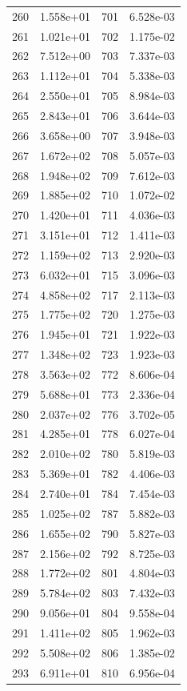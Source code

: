 \documentclass[12pt]{article}
\begin{document}
\begin{longtable}{@{}cccc@{}}
260 & 1.558e+01 & 701 & 6.528e-03 \\
261 & 1.021e+01 & 702 & 1.175e-02 \\
262 & 7.512e+00 & 703 & 7.337e-03 \\
263 & 1.112e+01 & 704 & 5.338e-03 \\
264 & 2.550e+01 & 705 & 8.984e-03 \\
265 & 2.843e+01 & 706 & 3.644e-03 \\
266 & 3.658e+00 & 707 & 3.948e-03 \\
267 & 1.672e+02 & 708 & 5.057e-03 \\
268 & 1.948e+02 & 709 & 7.612e-03 \\
269 & 1.885e+02 & 710 & 1.072e-02 \\
270 & 1.420e+01 & 711 & 4.036e-03 \\
271 & 3.151e+01 & 712 & 1.411e-03 \\
272 & 1.159e+02 & 713 & 2.920e-03 \\
273 & 6.032e+01 & 715 & 3.096e-03 \\
274 & 4.858e+02 & 717 & 2.113e-03 \\
275 & 1.775e+02 & 720 & 1.275e-03 \\
276 & 1.945e+01 & 721 & 1.922e-03 \\
277 & 1.348e+02 & 723 & 1.923e-03 \\
278 & 3.563e+02 & 772 & 8.606e-04 \\
279 & 5.688e+01 & 773 & 2.336e-04 \\
280 & 2.037e+02 & 776 & 3.702e-05 \\
281 & 4.285e+01 & 778 & 6.027e-04 \\
282 & 2.010e+02 & 780 & 5.819e-03 \\
283 & 5.369e+01 & 782 & 4.406e-03 \\
284 & 2.740e+01 & 784 & 7.454e-03 \\
285 & 1.025e+02 & 787 & 5.882e-03 \\
286 & 1.655e+02 & 790 & 5.827e-03 \\
287 & 2.156e+02 & 792 & 8.725e-03 \\
288 & 1.772e+02 & 801 & 4.804e-03 \\
289 & 5.784e+02 & 803 & 7.432e-03 \\
290 & 9.056e+01 & 804 & 9.558e-04 \\
291 & 1.411e+02 & 805 & 1.962e-03 \\
292 & 5.508e+02 & 806 & 1.385e-02 \\
293 & 6.911e+01 & 810 & 6.956e-04 \\

\end{longtable}
\end{document}
